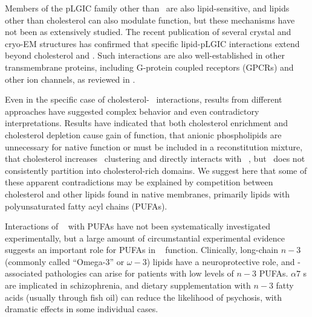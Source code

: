 Members of the pLGIC family other than \nachr~are also lipid-sensitive,\citep{Dunn1989,Sooksawate2001,Baenziger2011, Dostalova2014} and lipids other than cholesterol can also modulate function\citep{Bhushan1993,Cheng2007,Corrie2002,Corrie2002,Rankin1997,Wenz2005,Hamouda2006a}, but these mechanisms have not been as extensively studied.  The recent publication of several crystal and cryo-EM structures \citep{Basak2017,Althoff2014,Laverty2017,Zhu2018}
has confirmed that specific lipid-pLGIC interactions extend beyond cholesterol and \nachr.  Such interactions are also well-established in other transmembrane proteins, including G-protein coupled receptors (GPCRs) and other ion channels, as reviewed in \citep{Burger2000, Lee2004, Pucadyil2006a, Landreh2016, Smithers2012}. 

Even in the specific case of cholesterol-\nachr~ interactions, results from different approaches have suggested complex behavior and even contradictory interpretations.  Results have indicated that both cholesterol enrichment\citep{Dalziel1980,Criado1982,Ochoa1983} and cholesterol depletion\citep{Santiago2001} cause gain of function, that anionic phospholipids are unnecessary for native function\citep{Dalziel1980,Criado1982,Ochoa1983} or must be\citep{Corrie2002,Corrie_Lipid_2002} included in a reconstitution mixture,  that cholesterol increases \nachr~clustering\citep{Pato2008, Zhu2006a, Barrantes2007} and directly interacts with \nachr~\citep{Leibel1987,Jones1988}, but \nachr~does not consistently partition into cholesterol-rich domains\citep{Bermdez_Partition_2010}. We suggest here that some of these apparent contradictions may be explained by competition between cholesterol and other lipids found in native membranes, primarily lipids with polyunsaturated fatty acyl chains (PUFAs).   

Interactions of \nachr~ with PUFAs have not been systematically investigated experimentally, but a large amount of circumstantial experimental evidence suggests an important role for PUFAs in \nachr~ function.    Clinically, long-chain $n-3$  (commonly called ``Omega-3'' or $\omega-3$) lipids have a neuroprotective role\citep{Piomelli2007}, and \nachr-associated pathologies can arise for patients with low levels of $n-3$ PUFAs. $\alpha7$ \nachr s are implicated in schizophrenia\citep{Haydar2010}, and dietary supplementation with $n-3$ fatty acids (usually through fish oil) can reduce the likelihood of psychosis, with dramatic effects in some individual cases\citep{Amminger2010}.

